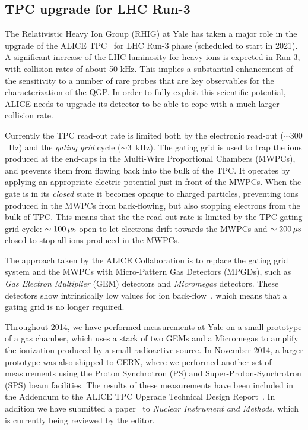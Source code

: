 \documentclass[12pt, a4paper, twoside, titlepage]{article}
\begin{document}
\subsection{TPC upgrade for LHC Run-3}
The Relativistic Heavy Ion Group (RHIG) at Yale has taken a major role in the upgrade of the ALICE TPC~\cite{ALICE:2014c} for LHC Run-3 phase (scheduled to start in 2021).
A significant increase of the LHC luminosity for heavy ions is expected in Run-3, with collision rates of about 50 kHz. This implies a substantial enhancement
of the sensitivity to a number of rare probes that are key observables for the characterization of the QGP. In order to fully exploit this scientific potential, ALICE needs to
upgrade its detector to be able to cope with a much larger collision rate.

Currently the TPC read-out rate is limited both by the electronic read-out ($\sim 300$~Hz) and the \emph{gating grid} cycle ($\sim 3$~kHz).
The gating grid is used to trap the ions produced at the end-caps in the Multi-Wire Proportional Chambers (MWPCs), and prevents them from flowing back into the bulk of the TPC.
It operates by applying an appropriate electric potential just in front of the MWPCs. When the gate is in its \emph{closed} state
it becomes opaque to charged particles, preventing ions produced in the MWPCs from back-flowing, but also stopping
electrons from the bulk of TPC. This means that the the read-out rate is limited by the TPC gating grid cycle: $\sim 100\, \rm \mu s$
open to let electrons drift towards the MWPCs and $\sim 200\, \rm \mu s$ closed to stop all ions produced in the MWPCs.

The approach taken by the ALICE Collaboration is to replace the gating grid system and the MWPCs with Micro-Pattern Gas Detectors (MPGDs),
such as \emph{Gas Electron Multiplier} (GEM) detectors and \emph{Micromegas} detectors. These detectors show intrinsically low values for ion back-flow~\cite{Colas:2004,Sauli:2006},
which means that a gating grid is no longer required.

Throughout 2014, we have performed measurements at Yale on a small prototype of a gas chamber, which uses a stack of two GEMs and a Micromegas to amplify the ionization
produced by a small radioactive source. In November 2014, a larger prototype was also shipped to CERN, where we performed another set of measurements using
the Proton Synchrotron (PS) and Super-Proton-Synchrotron (SPS) beam facilities.
The results of these measurements have been included in the Addendum to the ALICE TPC Upgrade Technical Design Report~\cite{ALICE:2015b}.
In addition we have submitted a paper~\cite{Aiola:2016a} to \emph{Nuclear Instrument and Methods}, which is currently being reviewed by the editor.
\end{document}
